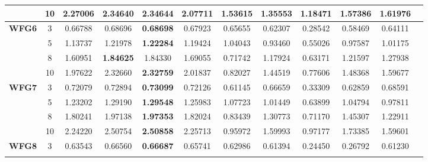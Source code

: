\documentclass{sig-alternate}
\begin{document}
\begin{table}[!htb]
\begin{tabular}{|c|c|c|c|c|c|c|c|c|c|c|c|}
& 10         & 2.27006          & 2.34640           & \textbf{2.34644}      & 2.07711          & 1.53615             & 1.35553             & 1.18471            & 1.57386              & 1.61976          \\ \hline
\multirow{4}{*}{\textbf{WFG6}}  & 3          & 0.66788          & 0.68696           & \textbf{0.68698}      & 0.67923          & 0.65655             & 0.62307             & 0.28542            & 0.58469              & 0.64111          \\ \cline{2-11} 
& 5          & 1.13737          & 1.21978           & \textbf{1.22284}      & 1.19424          & 1.04043             & 0.93460             & 0.55026            & 0.97587              & 1.01175          \\ \cline{2-11} 
& 8          & 1.60951          & \textbf{1.84625}  & 1.84330               & 1.69055          & 0.71742             & 1.17924             & 0.63171            & 1.21597              & 1.27938          \\ \cline{2-11} 
& 10         & 1.97622          & 2.32660           & \textbf{2.32759}      & 2.01837          & 0.82027             & 1.44519             & 0.77606            & 1.48368              & 1.59677          \\ \hline
\multirow{4}{*}{\textbf{WFG7}}  & 3          & 0.72079          & 0.72894           & \textbf{0.73099}      & 0.72126          & 0.61145             & 0.66659             & 0.33309            & 0.62859              & 0.68591          \\ \cline{2-11} 
& 5          & 1.23202          & 1.29190           & \textbf{1.29548}      & 1.25983          & 1.07723             & 1.01449             & 0.63899            & 1.04794              & 0.97811          \\ \cline{2-11} 
& 8          & 1.80241          & 1.97138           & \textbf{1.97353}      & 1.82024          & 0.83439             & 1.30773             & 0.71170            & 1.45307              & 1.22911          \\ \cline{2-11} 
& 10         & 2.24220          & 2.50754           & \textbf{2.50858}      & 2.25713          & 0.95972             & 1.59993             & 0.97177            & 1.73385              & 1.59601          \\ \hline
\multirow{4}{*}{\textbf{WFG8}}  & 3          & 0.63543          & 0.66560           & \textbf{0.66687}      & 0.65741          & 0.62986             & 0.61394             & 0.24450            & 0.26792              & 0.61230          \\ \cline{2-11} 

\end{tabular}
\end{table}
\end{document}
